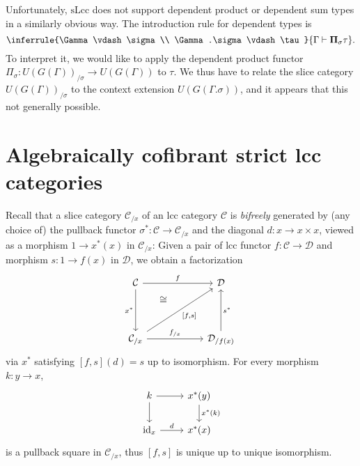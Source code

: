 \documentclass[a4paper]{article}
\theoremstyle{remark}
\theoremstyle{definition}
\begin{document}
Unfortunately, $\mathrm{sLcc}$ does not support dependent product or dependent sum types in a similarly obvious way.
The introduction rule for dependent types is
\begin{equation}
  \inferrule
  {\Gamma \vdash \sigma \\ \Gamma.\sigma \vdash \tau}
  {\Gamma \vdash \mathbf{\Pi}_\sigma \tau}.
\end{equation}
To interpret it, we would like to apply the dependent product functor $\Pi_\sigma : U(G(\Gamma))_{/ \sigma} \rightarrow U(G(\Gamma))$ to $\tau$.
We thus have to relate the slice category $U(G(\Gamma))_{/ \sigma}$ to the context extension $U(G(\Gamma.\sigma))$, and it appears that this not generally possible.

\section{Algebraically cofibrant strict lcc categories}
\label{sec:algebraically-cofibrant}

Recall that a slice category $\mathcal{C}_{/ x}$ of an lcc category $\mathcal{C}$ is \emph{bifreely} generated by (any choice of) the pullback functor $\sigma^* : \mathcal{C} \rightarrow \mathcal{C}_{/ x}$ and the diagonal $d : x \rightarrow x \times x$, viewed as a morphism $1 \rightarrow x^*(x)$ in $\mathcal{C}_{/ x}$:
Given a pair of lcc functor $f : \mathcal{C} \rightarrow \mathcal{D}$ and morphism $s : 1 \rightarrow f(x)$ in $\mathcal{D}$, we obtain a factorization
\begin{equation}
  \begin{tikzcd}
    \mathcal{C} \arrow[rr, "f"] \arrow[dd, "x^*"'] & \, & \mathcal{D} \\
    & & \, \\
    \mathcal{C}_{/ x} \arrow[rr, "f_{/ x}"] \arrow[uur, phantom, "\cong", near end] \arrow[uurr, "{[f, s]}"'] & & \mathcal{D}_{/ f(x)} \arrow[uu, "s^*"']
  \end{tikzcd}
\end{equation}
via $x^*$ satisfying $[f, s](d) = s$ up to isomorphism.
For every morphism $k : y \rightarrow x$,
\begin{equation}
  \begin{tikzcd}
    k \arrow[r] \arrow[d] & x^*(y) \arrow[d, "x^*(k)"] \\
    \mathrm{id}_x \arrow[r, "d"] & x^*(x)
  \end{tikzcd}
\end{equation}
is a pullback square in $\mathcal{C}_{/ x}$, thus $[f, s]$ is unique up to unique isomorphism.
\end{document}
